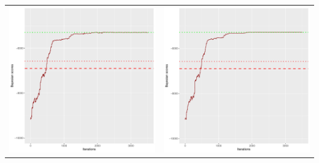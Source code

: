 \documentclass[]{scrartcl}
\begin{document}
\begin{table}[h!]
\begin{tabular}{cc}
\includegraphics[scale = 0.4]{./figs/alarm/v1/30/bayBoundsEvolution-3502.pdf} & 
\includegraphics[scale = 0.4]{./figs/alarm/v1/50/bayBoundsEvolution-3502.pdf} \\

\end{tabular}
\end{table}
\end{document}
